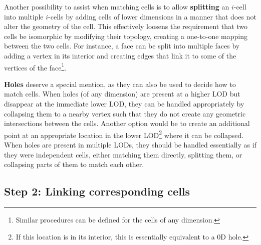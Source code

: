 Another possibility to assist when matching cells is to allow \textbf{splitting} an $i$-cell into multiple $i$-cells by adding cells of lower dimensions in a manner that does not alter the geometry of the cell.
This effectively loosens the requirement that two cells be isomorphic by modifying their topology, creating a one-to-one mapping between the two cells.
For instance, a face can be split into multiple faces by adding a vertex in its interior and creating edges that link it to some of the vertices of the face\footnote{Similar procedures can be defined for the cells of any dimension.}.

\textbf{Holes} deserve a special mention, as they can also be used to decide how to match cells.
When holes (of any dimension) are present at a higher LOD but disappear at the immediate lower LOD, they can be handled appropriately by collapsing them to a nearby vertex such that they do not create any geometric intersections between the cells.
Another option would be to create an additional point at an appropriate location in the lower LOD\footnote{If this location is in its interior, this is essentially equivalent to a 0D hole.} where it can be collapsed.
When holes are present in multiple LODs, they should be handled essentially as if they were independent cells, either matching them directly, splitting them, or collapsing parts of them to match each other.

\subsection{Step 2: Linking corresponding cells}
\label{ss:linkingrules}

